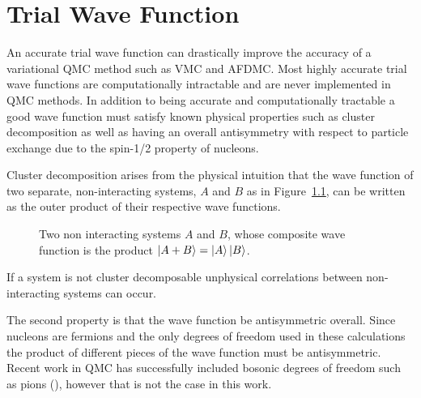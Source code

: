 \chapter{Trial Wave Function}
An accurate trial wave function can drastically improve the accuracy of a variational QMC method such as VMC and AFDMC. Most highly accurate trial wave functions are computationally intractable and are never implemented in QMC methods. In addition to being accurate and computationally tractable a good wave function must satisfy known physical properties such as cluster decomposition as well as having an overall antisymmetry with respect to particle exchange due to the spin-1/2 property of nucleons.

Cluster decomposition arises from the physical intuition that the wave function of two separate, non-interacting systems, $A$ and $B$ as in Figure~\ref{fig:cluster}, can be written as the outer product of their respective wave functions.
\begin{figure}[h]
   \centering
   \caption{Two non interacting systems $A$ and $B$, whose composite wave function is the product $\left| A+B \right>=\left| A \right>\left| B \right>$.}
   \label{fig:cluster}
\end{figure}
If a system is not cluster decomposable unphysical correlations between non-interacting systems can occur.

The second property is that the wave function be antisymmetric overall. Since nucleons are fermions and the only degrees of freedom used in these calculations the product of different pieces of the wave function must be antisymmetric. Recent work in QMC has successfully included bosonic degrees of freedom such as pions (\cite{madeira2018}), however that is not the case in this work.


